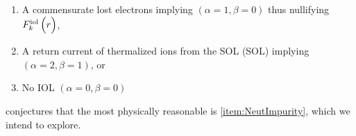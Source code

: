 \begin{enumerate}[label=(\roman*)]
	\item A commensurate lost electrons implying $\left(\alpha=1, \beta=0\right)$ thus nullifying $\FrIOL{k}$, \label{item:NeutElectron}
	\item A return current of thermalized ions from the \ac{SOL} (\gls{SOL}) implying $\left(\alpha=2, \beta=1\right)$, or \label{item:NeutImpurity}
	\item No \ac{IOL} $\left(\alpha=0, \beta=0\right)$ \label{item:NeutNoIOL}
\end{enumerate}

\citeauthor{Stacey2017} conjectures that the most physically reasonable is \cref{item:NeutImpurity}, which we intend to explore.


